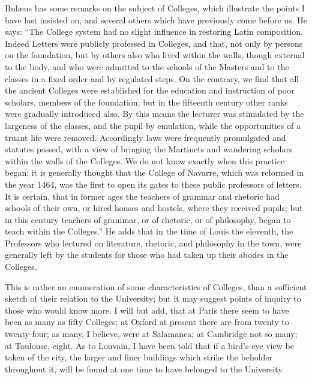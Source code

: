 Bulæus has some remarks on
the subject of Colleges, which illustrate the points I have last
insisted on, and several others which have previously come before us.
He says: ``The College system had no slight influence in restoring
Latin composition. Indeed Letters were publicly professed in Colleges,
and that, not only by persons on the foundation, but by others also
who lived within the walls, though external to the body, and who were
admitted to the schools of the Masters and to the classes in a fixed
order and by regulated steps. On the contrary, we find that all the
ancient Colleges were established for the education and instruction of
poor scholars, members of the foundation; but in the fifteenth century
other ranks were gradually introduced also. By this means the lecturer
was stimulated by the largeness of the classes, and the pupil by
emulation, while the opportunities of a truant life were removed.
Accordingly laws were frequently promulgated and statutes passed, with
a view of bringing the Martinets and wandering scholars within the
walls of the Colleges. We do not know exactly when this practice
began; it is generally thought that the College of Navarre, which was
reformed in the year 1464, was the first to open its gates to these
public professors of letters. It is certain, that in former ages the
teachers of grammar and rhetoric had schools of their own, or hired houses and hostels, where they received pupils; but in this
century teachers of grammar, or of rhetoric, or of philosophy, began
to teach within the Colleges.'' He adds that in the time of Louis the
eleventh, the Professors who lectured on literature, rhetoric, and
philosophy in the town, were generally left by the students for those
who had taken up their abodes in the Colleges.

This is rather an enumeration
of some characteristics of Colleges, than a sufficient sketch of their
relation to the University; but it may suggest points of inquiry to
those who would know more. I will but add, that at Paris there seem to
have been as many as fifty Colleges; at Oxford at present there are
from twenty to twenty-four; as many, I believe, were at Salamanca; at
Cambridge not so many; at Toulouse, eight. As to Louvain, I have been
told that if a bird's-eye view be taken of the city, the larger and
finer buildings which strike the beholder throughout it, will be found
at one time to have belonged to the University.


